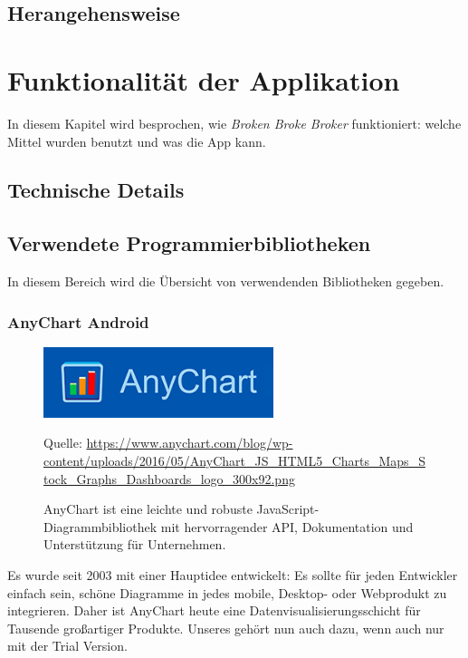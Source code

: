 \documentclass[10pt]{scrartcl}
\newcommand*{\quelle}{%
	\footnotesize Quelle:
}
\begin{document}
\subsection{Herangehensweise}

\section{Funktionalität der Applikation}
In diesem Kapitel wird besprochen, wie \textit{Broken Broke Broker} funktioniert: welche Mittel wurden benutzt und was die App kann.


\subsection{Technische Details}

\subsection{Verwendete Programmierbibliotheken}

In diesem Bereich wird die Übersicht von verwendenden Bibliotheken gegeben.

\subsubsection{AnyChart Android}

\begin{figure}[H]
	\centering
	\includegraphics[width=0.6\textwidth]{Bilder/BibliothekenLogos/Anychart.png}
	\caption{AnyChart ist eine leichte und robuste JavaScript-Diagrammbibliothek mit hervorragender API, Dokumentation und Unterstützung für Unternehmen.}
	\quelle\url{https://www.anychart.com/blog/wp-content/uploads/2016/05/AnyChart_JS_HTML5_Charts_Maps_Stock_Graphs_Dashboards_logo_300x92.png}
\end{figure}

Es wurde seit 2003 mit einer Hauptidee entwickelt: Es sollte für jeden Entwickler einfach sein, schöne Diagramme in jedes mobile, Desktop- oder Webprodukt zu integrieren. Daher ist AnyChart heute eine Datenvisualisierungsschicht für Tausende großartiger Produkte. Unseres gehört nun auch dazu, wenn auch nur mit der Trial Version.
\end{document}
